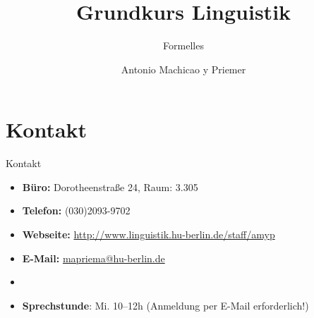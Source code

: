 
\title{\textbf{Grundkurs Linguistik}}

\subtitle{Formelles}

\author[aMyP]{
	{\small Antonio Machicao y Priemer}
}


\date{ }





\begin{frame}
  \HUtitle
\end{frame}

	

\section{Kontakt}
%

\begin{frame}{Kontakt}

\begin{itemize}
	\item \textbf{Büro:} Dorotheenstraße 24, Raum: 3.305
	\item \textbf{Telefon:} (030)2093-9702
	\item \textbf{Webseite:} \url{http://www.linguistik.hu-berlin.de/staff/amyp}
	\item \textbf{E-Mail:} \href{mailto:mapriema@hu-berlin.de}{mapriema@hu-berlin.de}
	\item[]
	\item \textbf{Sprechstunde}: Mi. 10--12h (Anmeldung per E-Mail erforderlich!)
\end{itemize}	

\end{frame}

